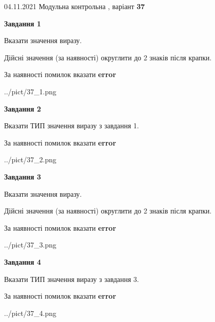\documentclass[11pt, ukrainian]{article}
\begin{document}
{04.11.2021 Модульна контрольна , варіант  \No \textbf { 37 }\par}
{
\begin {large}
{\begin {center}\textbf{Завдання 1}\end {center}}\par
Вказати значення виразу. \par
Дійсні значення (за наявності) округлити до 2 знаків після крапки. \par
За наявності помилок вказати \textbf{error}

\begin{center}
	{../pict/37_1.png}
\end{center}
\newpage

{\begin {center}\textbf{Завдання 2}\end {center}}\par
Вказати ТИП значення виразу з завдання 1. \par
За наявності помилок вказати \textbf{error}

\begin{center}
	{../pict/37_2.png}
\end{center}
\newpage

{\begin {center}\textbf{Завдання 3}\end {center}}\par
Вказати значення виразу. \par
Дійсні значення (за наявності) округлити до 2 знаків після крапки. \par
За наявності помилок вказати \textbf{error}

\begin{center}
	{../pict/37_3.png}
\end{center}
\newpage

{\begin {center}\textbf{Завдання 4}\end {center}}\par
Вказати ТИП значення виразу з завдання 3. \par
За наявності помилок вказати \textbf{error}

\begin{center}
	{../pict/37_4.png}
\end{center}
\newpage


\end{large}}
\end{document}
